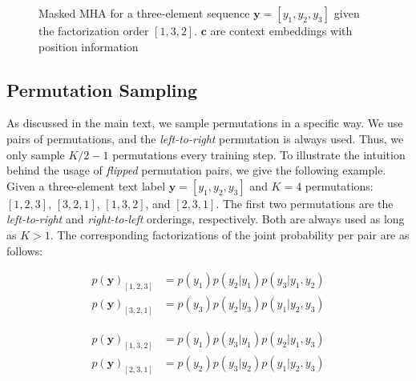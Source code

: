 \begin{figure}[htbp]
  \centering
    \hfill
     \hfill
    \hfill
     
     \caption{Masked MHA for a three-element sequence $\mathbf{y} = [y_1, y_2, y_3]$ given the factorization order $[1, 3, 2]$. $\mathbf{c}$ are context embeddings with position information}
    \label{fig:attn-connectivity}
\end{figure}

\subsection{Permutation Sampling}
\label{sec:perm-sampling}

As discussed in the main text, we sample permutations in a specific way. We use pairs of permutations, and the \textit{left-to-right} permutation is always used. Thus, we only sample $K / 2 - 1$ permutations every training step. To illustrate the intuition behind the usage of \textit{flipped} permutation pairs, we give the following example. Given a three-element text label $\mathbf{y} = [y_1, y_2, y_3]$ and $K = 4$ permutations: $[1, 2, 3]$, $[3, 2, 1]$, $[1, 3, 2]$, and $[2, 3, 1]$. The first two permutations are the \textit{left-to-right} and \textit{right-to-left} orderings, respectively. Both are always used as long as $K > 1$. The corresponding factorizations of the joint probability per pair are as follows:

\begin{align*}
    p(\mathbf{y})_{[1, 2, 3]} &= p(y_1) p(y_2 | y_1) p(y_3 | y_1, y_2) \\
    p(\mathbf{y})_{[3, 2, 1]} &= p(y_3) p(y_2 | y_3) p(y_1 | y_2, y_3)
\end{align*}
    
\begin{align*}
    p(\mathbf{y})_{[1, 3, 2]} &= p(y_1) p(y_3 | y_1) p(y_2 | y_1, y_3) \\
    p(\mathbf{y})_{[2, 3, 1]} &= p(y_2) p(y_3 | y_2) p(y_1 | y_2, y_3)
\end{align*}

